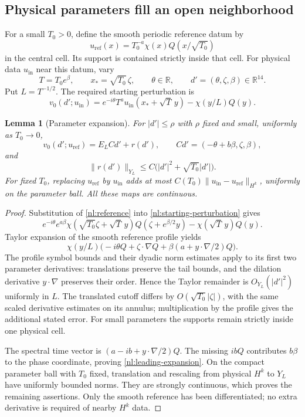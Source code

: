 \documentclass[11pt]{article}
\numberwithin{equation}{section}
\newtheorem{lemma}[theorem]{Lemma}
\theoremstyle{definition}
\theoremstyle{remark}
\begin{document}
\subsection{Physical parameters fill an open neighborhood}

For a small $T_0>0$, define the smooth periodic reference datum by
\begin{equation}\label{nl:reference}
 u_{\mathrm{ref}}(x)=T_0^{-a}\chi(x)Q(x/\sqrt{T_0})
\end{equation}
in the central cell. Its support is contained strictly inside that cell.
For physical data $u_{\mathrm{in}}$ near this datum, vary
\[
 T=T_0e^\beta,\qquad x_*=\sqrt{T_0}\,\zeta,\qquad \theta\in\mathbb R,
 \qquad d'=(\theta,\zeta,\beta)\in\mathbb R^{14}.
\]
Put $L=T^{-1/2}$. The required starting perturbation is
\begin{equation}\label{nl:starting-perturbation}
 v_0(d';u_{\mathrm{in}})
 =e^{-i\theta}T^a u_{\mathrm{in}}(x_*+\sqrt T\,y)
      -\chi(y/L)Q(y).
\end{equation}

\begin{lemma}[Parameter expansion]\label{nl:parameter-expansion}
For $|d'|\leq\rho$ with $\rho$ fixed and small, uniformly as $T_0\to0$,
\begin{equation}\label{nl:leading-expansion}
 v_0(d';u_{\mathrm{ref}})
 =E_L C d'+r(d'),\qquad
 C d'=(-\theta+b\beta,\zeta,\beta),
\end{equation}
and
\[
 \|r(d')\|_{Y_L}\leq C\bigl(|d'|^2+\sqrt{T_0}|d'|\bigr).
\]
For fixed $T_0$, replacing $u_{\mathrm{ref}}$ by $u_{\mathrm{in}}$
adds at most $C(T_0)\|u_{\mathrm{in}}-u_{\mathrm{ref}}\|_{H^k}$,
uniformly on the parameter ball. All these maps are continuous.
\end{lemma}

\begin{proof}
Substitution of \eqref{nl:reference} into
\eqref{nl:starting-perturbation} gives
\[
 e^{-i\theta}e^{a\beta}
 \chi(\sqrt{T_0}\zeta+\sqrt T\,y)
 Q(\zeta+e^{\beta/2}y)-\chi(\sqrt T\,y)Q(y).
\]
Taylor expansion of the smooth reference profile yields
\[
 \chi(y/L)\bigl(-i\theta Q+\zeta\cdot\nabla Q
                    +\beta(a+y\cdot\nabla/2)Q\bigr).
\]
The profile symbol bounds and their dyadic norm estimates apply to its
first two parameter derivatives: translations preserve the tail bounds,
and the dilation derivative $y\cdot\nabla$ preserves their order.
Hence the Taylor remainder is $O_{Y_L}(|d'|^2)$ uniformly in $L$.
The translated cutoff differs by $O(\sqrt{T_0}|\zeta|)$, with the same
scaled derivative estimates on its annulus; multiplication by the
profile gives the additional stated error. For small parameters the
supports remain strictly inside one physical cell.

The spectral time vector is $(a-ib+y\cdot\nabla/2)Q$.
The missing $ibQ$ contributes $b\beta$ to the phase coordinate, proving
\eqref{nl:leading-expansion}. On the compact parameter ball with $T_0$
fixed, translation and rescaling from physical $H^k$ to $Y_L$ have
uniformly bounded norms. They are strongly continuous, which proves the
remaining assertions. Only the smooth reference has been differentiated;
no extra derivative is required of nearby $H^k$ data.
\end{proof}
\end{document}
